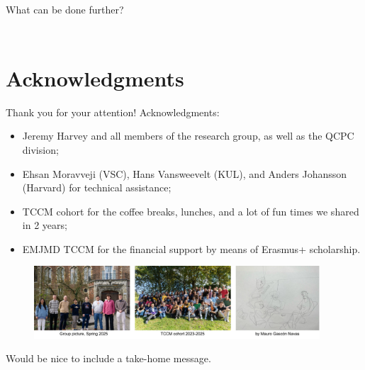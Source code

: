 \documentclass[11pt,t]{beamer}
\begin{document}
\begin{frame}{What can be done further?}
\begin{columns}[t]
\begin{column}{.35\textwidth}
\begin{figure}
			\end{figure}
		\end{column}
	\end{columns}
\end{frame}



\section{Acknowledgments}
\begin{frame}{Thank you for your attention!}
	\footnotesize
	Acknowledgments:
	\begin{itemize}
	\item Jeremy Harvey and all members of the research group, as well as the QCPC division;
	\item Ehsan Moravveji (VSC), Hans Vansweevelt (KUL), and Anders Johansson (Harvard) for technical assistance;
	\item TCCM cohort for the coffee breaks, lunches, and a lot of fun times we shared in 2 years;
	\item EMJMD TCCM for the financial support by means of Erasmus+ scholarship.
	\end{itemize}
	\begin{figure}
		\centering
		\includegraphics[width=0.95\textwidth]{Figures/acknowledgments.pdf}
	\end{figure}
	\small
	Would be nice to include a take-home message.
\end{frame}
\end{document}
